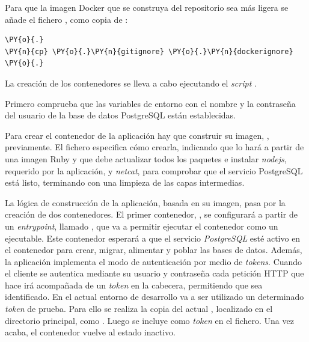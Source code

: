 Para que la imagen Docker que se construya del repositorio sea más ligera se añade el fichero , como copia de :

\begin{codelisting}
\label{code:.dockerignore}
\begin{Verbatim}[fontsize=\relsize{-2.5},fontseries=b,commandchars=\\\{\}]
\PY{o}{.}
\PY{n}{cp} \PY{o}{.}\PY{n}{gitignore} \PY{o}{.}\PY{n}{dockerignore}
\PY{o}{.}
\end{Verbatim}
\end{codelisting}

La creación de los contenedores se lleva a cabo ejecutando el \textit{script} .

Primero comprueba que las variables de entorno con el nombre y la contraseña del usuario de la base de datos PostgreSQL están establecidas.

Para crear el contenedor de la aplicación hay que construir su imagen, , previamente. El fichero  especifica cómo crearla, indicando que lo hará a partir de una imagen Ruby y que debe actualizar todos los paquetes e instalar \textit{nodejs}, requerido por la aplicación, y \textit{netcat}, para comprobar que el servicio PostgreSQL está listo, terminando con una limpieza de las capas intermedias. 

La lógica de construcción de la aplicación, basada en su imagen, pasa por la creación de dos contenedores. El primer contenedor, , se configurará a partir de un \textit{entrypoint}, llamado , que va a permitir ejecutar el contenedor como un ejecutable. Este contenedor esperará a que el servicio \textit{PostgreSQL} esté activo en el contenedor  para crear, migrar, alimentar y poblar las bases de datos. Además, la aplicación implementa el modo de autenticación por medio de \textit{tokens}. Cuando el cliente se autentica mediante su usuario y contraseña cada petición HTTP que hace irá acompañada de un \textit{token} en la cabecera, permitiendo que sea identificado. En el actual entorno de desarrollo va a ser utilizado un determinado \textit{token} de prueba. Para ello se realiza la copia del actual , localizado en el directorio principal, como . Luego se incluye como \textit{token} en el fichero. Una vez acaba, el contenedor  vuelve al estado inactivo. 

